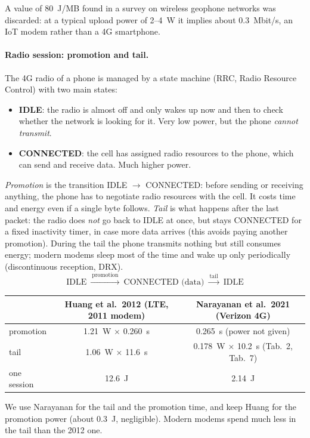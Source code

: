 \documentclass[11pt,a4paper]{article}
\begin{document}
A value of 80~J/MB found in a survey on wireless geophone networks was
discarded: at a typical upload power of 2--4~W it implies about 0.3~Mbit/s,
an IoT modem rather than a 4G smartphone.

\paragraph{Radio session: promotion and tail.} The 4G radio of a phone is
managed by a state machine (RRC, Radio Resource Control) with two main states:
\begin{itemize}
  \item \textbf{IDLE}: the radio is almost off and only wakes up now and then
        to check whether the network is looking for it. Very low power, but
        the phone \emph{cannot transmit}.
  \item \textbf{CONNECTED}: the cell has assigned radio resources to the
        phone, which can send and receive data. Much higher power.
\end{itemize}
\emph{Promotion} is the transition IDLE $\to$ CONNECTED: before sending or
receiving anything, the phone has to negotiate radio resources with the cell.
It costs time and energy even if a single byte follows. \emph{Tail} is what
happens after the last packet: the radio does \emph{not} go back to IDLE at
once, but stays CONNECTED for a fixed inactivity timer, in case more data
arrives (this avoids paying another promotion). During the tail the phone
transmits nothing but still consumes energy; modern modems sleep most of the
time and wake up only periodically (discontinuous reception, DRX).
\[
\text{IDLE}\ \xrightarrow{\ \text{promotion}\ }\ \text{CONNECTED (data)}\
\xrightarrow{\ \text{tail}\ }\ \text{IDLE}
\]

\begin{center}
\begin{tabular}{lcc}
\toprule
& Huang et al.\ 2012 (LTE, 2011 modem) & Narayanan et al.\ 2021 (Verizon 4G) \\
\midrule
promotion & \SI{1.21}{\watt} $\times$ \SI{0.260}{\second} & \SI{0.265}{\second} (power not given) \\
tail      & \SI{1.06}{\watt} $\times$ \SI{11.6}{\second}  & \SI{0.178}{\watt} $\times$ \SI{10.2}{\second} (Tab.~2, Tab.~7) \\
one session & \SI{12.6}{\joule} & \SI{2.14}{\joule} \\
\bottomrule
\end{tabular}
\end{center}
We use Narayanan for the tail and the promotion time, and keep Huang for the
promotion power (about \SI{0.3}{\joule}, negligible). Modern modems spend much
less in the tail than the 2012 one.
\end{document}
